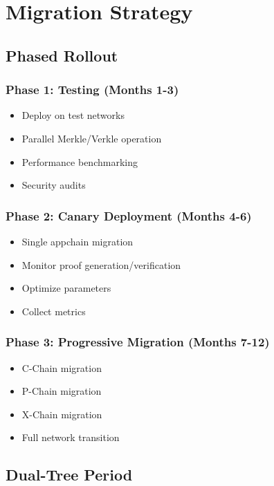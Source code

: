 \section{Migration Strategy}


\subsection{Phased Rollout}

\subsubsection{Phase 1: Testing (Months 1-3)}
\begin{itemize}
    \item Deploy on test networks
    \item Parallel Merkle/Verkle operation
    \item Performance benchmarking
    \item Security audits
\end{itemize}

\subsubsection{Phase 2: Canary Deployment (Months 4-6)}
\begin{itemize}
    \item Single appchain migration
    \item Monitor proof generation/verification
    \item Optimize parameters
    \item Collect metrics
\end{itemize}

\subsubsection{Phase 3: Progressive Migration (Months 7-12)}
\begin{itemize}
    \item C-Chain migration
    \item P-Chain migration
    \item X-Chain migration
    \item Full network transition
\end{itemize}

\subsection{Dual-Tree Period}

